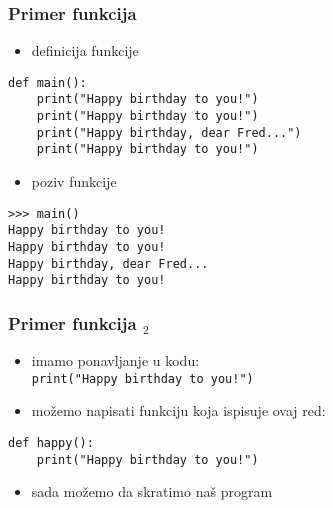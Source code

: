 \documentclass[utf8,compress,aspectratio=169]{beamer}
\begin{document}

\begin{frame}[fragile]
  \frametitle{Primer funkcija}
  \begin{itemize}
    \item definicija funkcije
  \end{itemize}
\begin{verbatim}
def main():
    print("Happy birthday to you!")
    print("Happy birthday to you!")
    print("Happy birthday, dear Fred...")
    print("Happy birthday to you!")
\end{verbatim}
  \begin{itemize}
    \item poziv funkcije
  \end{itemize}
\begin{verbatim}
>>> main()
Happy birthday to you!
Happy birthday to you!
Happy birthday, dear Fred...
Happy birthday to you!
\end{verbatim}
\end{frame}

\begin{frame}[fragile]
  \frametitle{Primer funkcija $_2$}
  \begin{itemize}
    \item imamo ponavljanje u kodu: \\
      \texttt{print("Happy birthday to you!")}
    \item možemo napisati funkciju koja ispisuje ovaj red:
  \end{itemize}
\begin{verbatim}
def happy():
    print("Happy birthday to you!")
\end{verbatim}
  \begin{itemize}
    \item sada možemo da skratimo naš program
  \end{itemize}
\end{frame}
\end{document}
